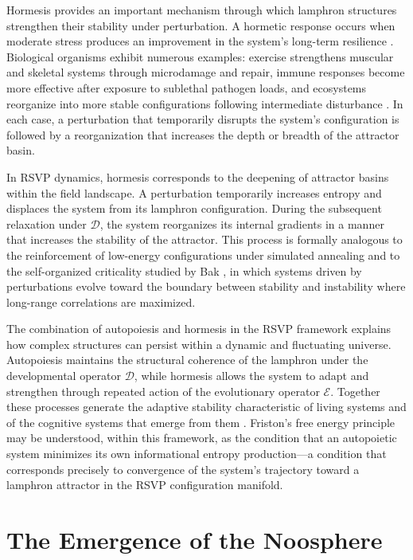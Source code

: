 \documentclass[12pt]{article}
\begin{document}
Hormesis provides an important mechanism through which lamphron structures strengthen their stability under perturbation. A hormetic response occurs when moderate stress produces an improvement in the system's long-term resilience \cite{bak1996}. Biological organisms exhibit numerous examples: exercise strengthens muscular and skeletal systems through microdamage and repair, immune responses become more effective after exposure to sublethal pathogen loads, and ecosystems reorganize into more stable configurations following intermediate disturbance \cite{kauffman2008,morowitz2002}. In each case, a perturbation that temporarily disrupts the system's configuration is followed by a reorganization that increases the depth or breadth of the attractor basin.

In RSVP dynamics, hormesis corresponds to the deepening of attractor basins within the field landscape. A perturbation temporarily increases entropy and displaces the system from its lamphron configuration. During the subsequent relaxation under $\mathcal{D}$, the system reorganizes its internal gradients in a manner that increases the stability of the attractor. This process is formally analogous to the reinforcement of low-energy configurations under simulated annealing \cite{strogatz1994} and to the self-organized criticality studied by Bak \cite{bak1996}, in which systems driven by perturbations evolve toward the boundary between stability and instability where long-range correlations are maximized.

The combination of autopoiesis and hormesis in the RSVP framework explains how complex structures can persist within a dynamic and fluctuating universe. Autopoiesis maintains the structural coherence of the lamphron under the developmental operator $\mathcal{D}$, while hormesis allows the system to adapt and strengthen through repeated action of the evolutionary operator $\mathcal{E}$. Together these processes generate the adaptive stability characteristic of living systems \cite{maturana1980,kauffman2008} and of the cognitive systems that emerge from them \cite{friston2010}. Friston's free energy principle \cite{friston2010} may be understood, within this framework, as the condition that an autopoietic system minimizes its own informational entropy production---a condition that corresponds precisely to convergence of the system's trajectory toward a lamphron attractor in the RSVP configuration manifold.

\section{The Emergence of the Noosphere}
\label{sec:noosphere}
\end{document}

